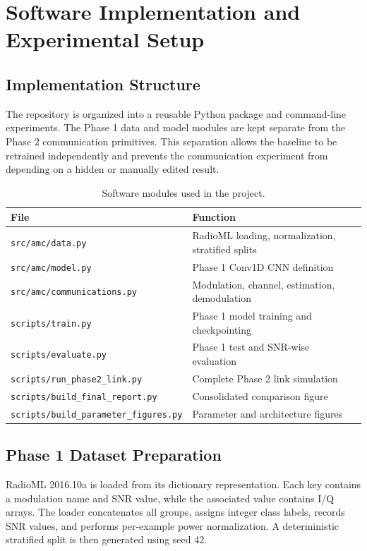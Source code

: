 \chapter{Software Implementation and Experimental Setup}

\section{Implementation Structure}
The repository is organized into a reusable Python package and command-line
experiments. The Phase 1 data and model modules are kept separate from the
Phase 2 communication primitives. This separation allows the baseline to be
retrained independently and prevents the communication experiment from
depending on a hidden or manually edited result.

\begin{table}[H]
\centering
\caption{Software modules used in the project.}
\begin{tabular}{p{5cm} p{8cm}}
\hline
\textbf{File} & \textbf{Function}\\
\hline
\texttt{src/amc/data.py} & RadioML loading, normalization, stratified splits\\
\texttt{src/amc/model.py} & Phase 1 Conv1D CNN definition\\
\texttt{src/amc/communications.py} & Modulation, channel, estimation, demodulation\\
\texttt{scripts/train.py} & Phase 1 model training and checkpointing\\
\texttt{scripts/evaluate.py} & Phase 1 test and SNR-wise evaluation\\
\texttt{scripts/run\_phase2\_link.py} & Complete Phase 2 link simulation\\
\texttt{scripts/build\_final\_report.py} & Consolidated comparison figure\\
\texttt{scripts/build\_parameter\_figures.py} & Parameter and architecture figures\\
\hline
\end{tabular}
\end{table}

\section{Phase 1 Dataset Preparation}
RadioML 2016.10a is loaded from its dictionary representation. Each key
contains a modulation name and SNR value, while the associated value contains
I/Q arrays. The loader concatenates all groups, assigns integer class labels,
records SNR values, and performs per-example power normalization. A
deterministic stratified split is then generated using seed 42.


